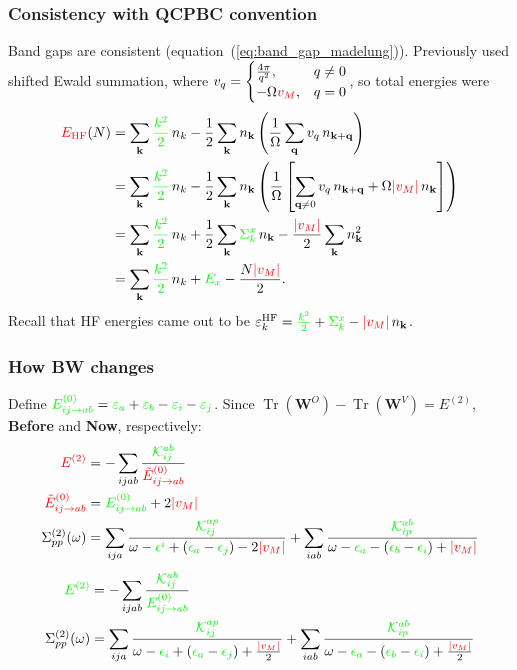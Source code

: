 \begin{frame}
    \frametitle{Consistency with QCPBC convention}
Band gaps are consistent (equation~(\ref{eq:band_gap_madelung})). \pause Previously used shifted Ewald summation, where $v_q = \begin{cases} \frac{4\pi}{q^2}, & q\neq 0\\ -\Omega\textcolor{red}{v_M}, & q=0\end{cases}$\pause, so total energies were 
\begin{align}
    \textcolor{red}{E_{\rm HF}}(N) &= \sum_{\mathbf k} \textcolor{green}{\frac{k^2}{2}}\, n_k - \frac{1}{2}\sum_{\mathbf{k}} n_{\mathbf{k}}\left(\frac{1}{\Omega}\sum_{\mathbf{q}} v_q\, n_{\mathbf{k}+\mathbf{q}}\right) \\
    &= \sum_{\mathbf k} \textcolor{green}{\frac{k^2}{2}}\, n_k - \frac{1}{2}\sum_{\mathbf{k}} n_{\mathbf{k}}\left(\frac{1}{\Omega}\left[\sum_{\mathbf{q}\neq 0} v_q\, n_{\mathbf{k}+\mathbf{q}} + \Omega\textcolor{red}{|v_M|}\, n_{\mathbf{k}}\right]\right) \\
    &= \sum_{\mathbf k} \textcolor{green}{\frac{k^2}{2}}\, n_k + \frac{1}{2}\sum_{\mathbf{k}}\textcolor{green}{\Sigma^x_k}\, n_{\mathbf{k}} - \frac{\textcolor{red}{|v_M|}}{2}\sum_{\mathbf{k}} n_{\mathbf{k}}^2 \\
    &= \sum_{\mathbf k} \textcolor{green}{\frac{k^2}{2}}\, n_k + \textcolor{green}{E_x} - \frac{N\textcolor{red}{|v_M|}}{2}.
\end{align} \pause
Recall that HF energies came out to be $\varepsilon^{\rm HF}_k = \textcolor{green}{\frac{k^2}{2}} + \textcolor{green}{\Sigma^x_k} - \textcolor{red}{|v_M|}\, n_{\mathbf{k}}$.
\end{frame}
\begin{frame}
    \frametitle{How BW changes} Define $\textcolor{green}{E^{(0)}_{ij\to ab}} = \textcolor{green}{\varepsilon_a} + \textcolor{green}{\varepsilon_b} - \textcolor{green}{\varepsilon_i} - \textcolor{green}{\varepsilon_j}$. \pause 
Since $\operatorname{Tr}(\mathbf{W}^{O}) - \operatorname{Tr}(\mathbf{W}^{V})=E^{(2)}$, \pause
\textbf{Before} and \textbf{Now}, respectively:\begin{align}
\textcolor{red}{{E}^{(2)}} &= -\sum_{ijab}\frac{\textcolor{green}{\mathcal{K}_{ij}^{ab}}}{{\textcolor{red}{\tilde{E}_{ij\rightarrow ab}^{(0)}}}}\\
\textcolor{red}{\tilde{E}_{ij\rightarrow ab}^{(0)}}&= \textcolor{green}{E^{(0)}_{ij\to ab}}+2\textcolor{red}{|v_M|}\\
\Sigma^{(2)}_{pp}(\omega) &= \sum_{ija} \frac{\textcolor{green}{\mathcal{K}_{ij}^{ap}}}{\omega -\textcolor{green}{\epsilon^i} + \left( \textcolor{green}{\epsilon_a} - \textcolor{green}{\epsilon_j}\right) - 2\textcolor{red}{|v_M|}} + \sum_{iab} \frac{\textcolor{green}{\mathcal{K}_{ip}^{ab}}}{\omega-\textcolor{green}{\epsilon_a} - \left(\textcolor{green}{\epsilon_b} - \textcolor{green}{\epsilon_i}\right) + \textcolor{red}{|v_M|}} \end{align} \pause
\begin{align}
\textcolor{green}{E^{(2)}} &= -\sum_{ijab}\frac{\textcolor{green}{\mathcal{K}_{ij}^{ab}}}{{\textcolor{green}{E_{ij\rightarrow ab}^{(0)}}}}\\
\Sigma^{(2)}_{pp}(\omega)&= \sum_{ija} \frac{\textcolor{green}{\mathcal{K}_{ij}^{ap}}}{\omega-\textcolor{green}{\epsilon_i} + \left( \textcolor{green}{\epsilon_a} - \textcolor{green}{\epsilon_j}
\right)+ \frac{\textcolor{red}{|v_M|}}{2}} + \sum_{iab} \frac{\textcolor{green}{\mathcal{K}_{ip}^{ab}}}{\omega-\textcolor{green}{\epsilon_a} - \left(\textcolor{green}{\epsilon_b} - \textcolor{green}{\epsilon_i}\right)+ \frac{\textcolor{red}{|v_M|}}{2}}
\end{align}

\end{frame}
